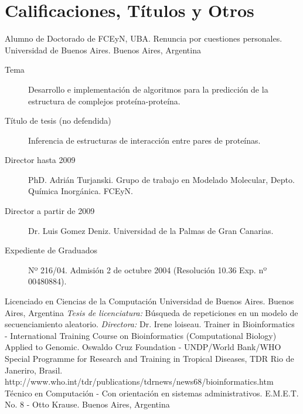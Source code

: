 \section{Calificaciones, Títulos y Otros}

	{Alumno de Doctorado de FCEyN, UBA. Renuncia por cuestiones personales.}
	{Universidad de Buenos Aires.}
	{Buenos Aires, Argentina}
	{}
	{\begin{description}
	\item [Tema] Desarrollo e implementación de algoritmos para la predicción de la estructura de complejos proteína-proteína.
	\item [Título de tesis (no defendida)] Inferencia de estructuras de interacción entre pares de proteínas.
	\item [Director hasta 2009] PhD. Adrián Turjanski. Grupo de trabajo en Modelado Molecular, Depto. Química Inorgánica. FCEyN.	
	\item [Director a partir de 2009] Dr. Luis Gomez Deniz. Universidad de la Palmas de Gran Canarias.
	\item [Expediente de Graduados] Nº 216/04. Admisión 2 de octubre 2004 (Resolución 10.36	Exp. nº 00480884).
	\end{description}}
	{Licenciado en Ciencias de la Computación}
	{Universidad de Buenos Aires.}
	{Buenos Aires, Argentina}
	{}
	{\emph{Tesis de licenciatura:} Búsqueda de repeticiones en un
	modelo de secuenciamiento aleatorio. \emph{Directora:} Dr. Irene loiseau.}
	{Trainer in Bioinformatics - International Training Course on Bioinformatics (Computational Biology) Applied to Genomic.}
	{Oswaldo Cruz Foundation - UNDP/World Bank/WHO Special Programme for Research and Training in Tropical Diseases, TDR}
	{Rio de Janeriro, Brasil.}
	{}
	{http://www.who.int/tdr/publications/tdrnews/news68/bioinformatics.htm}
	{Técnico en Computación - Con orientación en sistemas administrativos.}
	{E.M.E.T. No. 8 - Otto Krause.}
	{Buenos Aires, Argentina}
	{}
	{}

